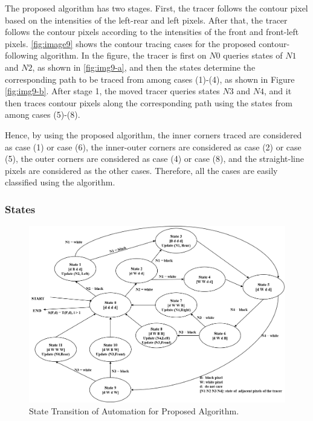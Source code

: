 The proposed algorithm has two stages. First, the tracer follows the contour pixel based on the intensities of the left-rear and left pixels. After that, the tracer follows the contour pixels according to the intensities of the front and front-left pixels. \ref{fig:image9} shows the contour tracing cases for the proposed contour-following algorithm. In the figure, the tracer is first on $N0$ queries states of $N1$ and $N2$, as shown in  \ref{fig:img9-a}, and then the states determine the corresponding path to be traced from among cases (1)-(4), as shown in Figure \ref{fig:img9-b}. After stage 1, the moved tracer queries states $N3$ and $N4$, and it then traces contour pixels along the corresponding path using the states from among cases (5)-(8). 


Hence, by using the proposed algorithm, the inner corners traced are considered as case (1) or case (6), the inner-outer corners are considered as case (2) or case (5), the outer corners are considered as case (4) or case (8), and the straight-line pixels are considered as the other cases. Therefore, all the cases are easily classified using the algorithm. 




\subsubsection{States}

\begin{figure}[htbp]
	\centering
	\includegraphics[width=1.0\textwidth]{4.Proposed/state.png}
	\caption{State Transition of Automation for Proposed Algorithm.}
	\label{fig:image10}
\end{figure}

